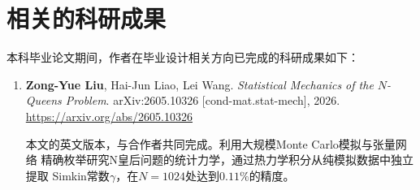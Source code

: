\chapter*{相关的科研成果}

本科毕业论文期间，作者在毕业设计相关方向已完成的科研成果如下：

\begin{enumerate}
  \item \textbf{Zong-Yue Liu}, Hai-Jun Liao, Lei Wang.
  \textit{Statistical Mechanics of the $N$-Queens Problem}.
  arXiv:2605.10326 [cond-mat.stat-mech], 2026.\\
  \href{https://arxiv.org/abs/2605.10326}{https://arxiv.org/abs/2605.10326}

  本文的英文版本，与合作者共同完成。利用大规模Monte Carlo模拟与张量网络
  精确枚举研究N皇后问题的统计力学，通过热力学积分从纯模拟数据中独立提取
  Simkin常数$\gamma$，在$N=1024$处达到$0.11\%$的精度。
\end{enumerate}
